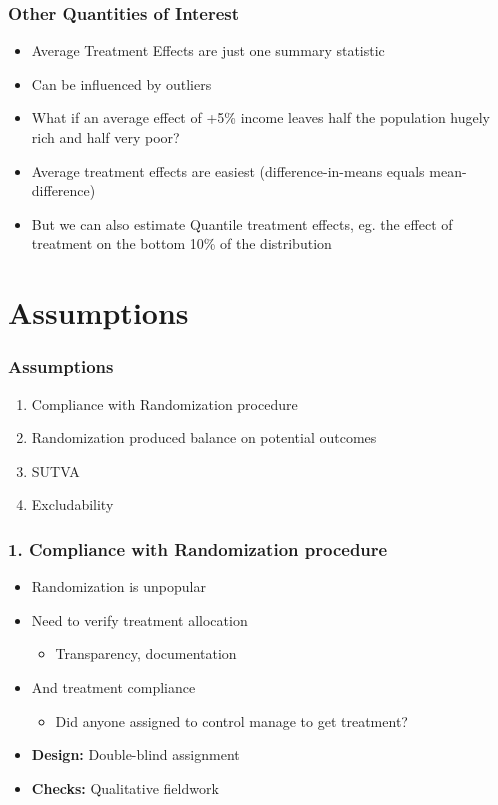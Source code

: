 \documentclass[xcolor=x11names,compress]{beamer}\usepackage[]{graphicx}\usepackage[]{color}
\renewcommand{\(}{\begin{columns}}
\renewcommand{\)}{\end{columns}}
\newcommand{\<}[1]{\begin{column}{#1}}
\renewcommand{\>}{\end{column}}
\begin{document}
\begin{frame}
\frametitle{Other Quantities of Interest}
\begin{itemize}
\item Average Treatment Effects are just one summary statistic
\pause
\item Can be influenced by outliers
\pause
\item What if an average effect of +5\% income leaves half the population hugely rich and half very poor?
\pause
\item Average treatment effects are easiest (difference-in-means equals mean-difference)
\pause
\item But we can also estimate Quantile treatment effects, eg. the effect of treatment on the bottom 10\% of the distribution
\end{itemize}
\end{frame}

\section{Assumptions}

\begin{frame}
\frametitle{Assumptions}
\begin{enumerate}
\item Compliance with Randomization procedure
\item Randomization produced balance on potential outcomes
\item SUTVA
\item Excludability
\end{enumerate}
\end{frame}

\begin{frame}
\frametitle{1. Compliance with Randomization procedure}
\begin{itemize}
\item Randomization is unpopular
\pause
\item Need to verify treatment allocation
\begin{itemize}
\item Transparency, documentation
\end{itemize}
\pause
\item And treatment compliance
\begin{itemize}
\item Did anyone assigned to control manage to get treatment?
\pause
\end{itemize}
\item \textbf{Design:} Double-blind assignment
\item \textbf{Checks:} Qualitative fieldwork
\end{itemize}
\end{frame}
\end{document}
